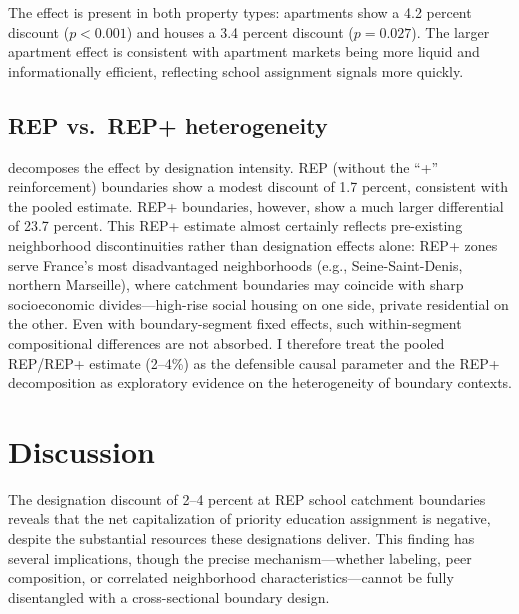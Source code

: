 \documentclass[12pt]{article}
\begin{document}
The effect is present in both property types: apartments show a 4.2 percent discount ($p < 0.001$) and houses a 3.4 percent discount ($p = 0.027$). The larger apartment effect is consistent with apartment markets being more liquid and informationally efficient, reflecting school assignment signals more quickly.



\subsection{REP vs.\ REP+ heterogeneity}

 decomposes the effect by designation intensity. REP (without the ``+'' reinforcement) boundaries show a modest discount of 1.7 percent, consistent with the pooled estimate. REP+ boundaries, however, show a much larger differential of 23.7 percent. This REP+ estimate almost certainly reflects pre-existing neighborhood discontinuities rather than designation effects alone: REP+ zones serve France's most disadvantaged neighborhoods (e.g., Seine-Saint-Denis, northern Marseille), where catchment boundaries may coincide with sharp socioeconomic divides---high-rise social housing on one side, private residential on the other. Even with boundary-segment fixed effects, such within-segment compositional differences are not absorbed. I therefore treat the pooled REP/REP+ estimate (2--4\%) as the defensible causal parameter and the REP+ decomposition as exploratory evidence on the heterogeneity of boundary contexts.




\section{Discussion}
\label{sec:discussion}

The designation discount of 2--4 percent at REP school catchment boundaries reveals that the net capitalization of priority education assignment is negative, despite the substantial resources these designations deliver. This finding has several implications, though the precise mechanism---whether labeling, peer composition, or correlated neighborhood characteristics---cannot be fully disentangled with a cross-sectional boundary design.
\end{document}
